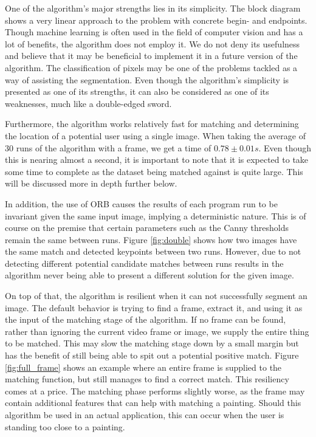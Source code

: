 One of the algorithm's major strengths lies in its simplicity. The block diagram shows a very linear approach to the problem with concrete begin- and endpoints. Though machine learning is often used in the field of computer vision and has a lot of benefits, the algorithm does not employ it. We do not deny its usefulness and believe that it may be beneficial to implement it in a future version of the algorithm. The classification of pixels may be one of the problems tackled as a way of assisting the segmentation. Even though the algorithm's simplicity is presented as one of its strengths, it can also be considered as one of its weaknesses, much like a double-edged sword.


Furthermore, the algorithm works relatively fast for matching and determining the location of a potential user using a single image. When taking the average of 30 runs of the algorithm with a frame, we get a time of $0.78\pm0.01 s$. Even though this is nearing almost a second, it is important to note that it is expected to take some time to complete as the dataset being matched against is quite large. This will be discussed more in depth further below.


In addition, the use of ORB causes the results of each program run to be invariant given the same input image, implying a deterministic nature. This is of course on the premise that certain parameters such as the Canny thresholds remain the same between runs. Figure \ref{fig:double} shows how two images have the same match and detected keypoints between two runs. However, due to not detecting different potential candidate matches between runs results in the algorithm never being able to present a different solution for the given image.


On top of that, the algorithm is resilient when it can not successfully segment an image. The default behavior is trying to find a frame, extract it, and using it as the input of the matching stage of the algorithm. If no frame can be found, rather than ignoring the current video frame or image, we supply the entire thing to be matched. This may slow the matching stage down by a small margin but has the benefit of still being able to spit out a potential positive match. Figure \ref{fig:full_frame} shows an example where an entire frame is supplied to the matching function, but still manages to find a correct match. This resiliency comes at a price. The matching phase performs slightly worse, as the frame may contain additional features that can help with matching a painting. Should this algorithm be used in an actual application, this can occur when the user is standing too close to a painting. 


